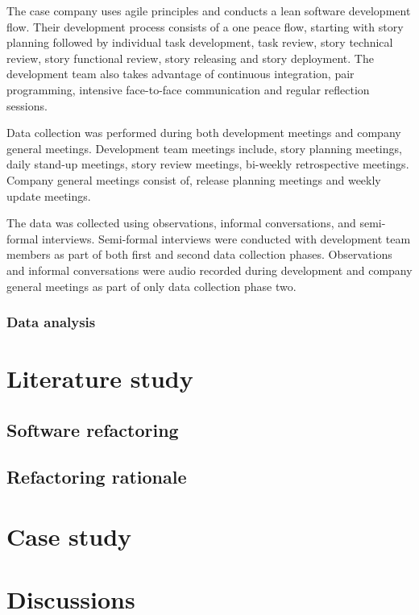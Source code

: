 \documentclass[english,12pt,a4paper,pdftex,sci,utf8]{aaltothesis}
\begin{document}
The case company uses agile principles and conducts a lean software development flow. Their development process consists of a one peace flow, starting with story planning followed by individual task development, task review, story technical review, story functional review, story releasing and story deployment. The development team also takes advantage of continuous integration, pair programming, intensive face-to-face communication and regular reflection sessions.

Data collection was performed during both development meetings and company general meetings. Development team meetings include, story planning meetings, daily stand-up meetings, story review meetings, bi-weekly retrospective meetings. Company general meetings consist of, release planning meetings and weekly update meetings. 

The data was collected using observations, informal conversations, and semi-formal interviews. Semi-formal interviews were conducted with development team members as part of both first and second data collection phases. Observations and informal conversations were audio recorded during development and company general meetings as part of only data collection phase two.

\subsubsection{Data analysis} \label{data analysis}

\clearpage

\section{Literature study} \label{literature}
\subsection{Software refactoring}
\subsection{Refactoring rationale}


\section{Case study} \label{case study}


\section{Discussions} \label{discussions}
\end{document}
